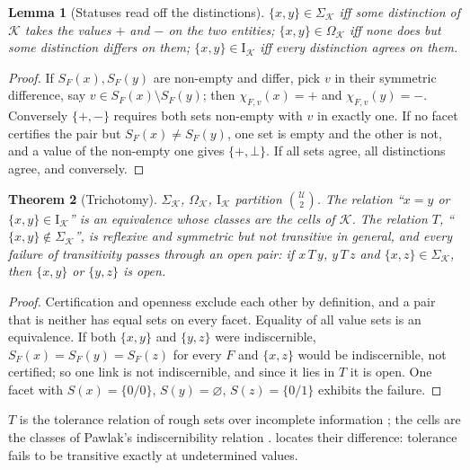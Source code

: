 \documentclass[11pt,twocolumn,a4paper]{article}
\theoremstyle{plain}
\newtheorem{theorem}{Theorem}[section]
\newtheorem{lemma}[theorem]{Lemma}
\theoremstyle{definition}
\theoremstyle{remark}
\newcommand{\U}{\mathcal{U}}
\newcommand{\Kc}{\mathcal{K}}
\newcommand{\Sig}{\Sigma}
\newcommand{\Opn}{\Omega}
\newcommand{\Ind}{\mathrm{I}}
\newcommand{\cp}{\mathord{+}}
\newcommand{\cm}{\mathord{-}}
\newcommand{\cz}{\mathord{\bot}}
\begin{document}
\begin{lemma}[Statuses read off the distinctions]
\label{lem:status}
$\{x,y\}\in\Sig_\Kc$ iff some distinction of $\Kc$ takes the values $\cp$ and
$\cm$ on the two entities; $\{x,y\}\in\Opn_\Kc$ iff none does but some
distinction differs on them; $\{x,y\}\in\Ind_\Kc$ iff every distinction
agrees on them.
\end{lemma}

\begin{proof}
If $S_F(x),S_F(y)$ are non-empty and differ, pick $v$ in their symmetric
difference, say $v\in S_F(x)\setminus S_F(y)$; then $\chi_{F,v}(x)=\cp$ and
$\chi_{F,v}(y)=\cm$. Conversely $\{\cp,\cm\}$ requires both sets non-empty with
$v$ in exactly one. If no facet certifies the pair but $S_F(x)\ne S_F(y)$, one
set is empty and the other is not, and a value of the non-empty one gives
$\{\cp,\cz\}$. If all sets agree, all distinctions agree, and conversely.
\end{proof}

\begin{theorem}[Trichotomy]
\label{thm:trichotomy}
$\Sig_\Kc$, $\Opn_\Kc$, $\Ind_\Kc$ partition $\binom{\U}{2}$. The relation
``$x=y$ or $\{x,y\}\in\Ind_\Kc$'' is an equivalence whose classes are the
\emph{cells} of $\Kc$. The relation $T$, ``$\{x,y\}\notin\Sig_\Kc$'', is
reflexive and symmetric but not transitive in general, and every failure of
transitivity passes through an open pair: if $x\,T\,y$, $y\,T\,z$ and
$\{x,z\}\in\Sig_\Kc$, then $\{x,y\}$ or $\{y,z\}$ is open.
\end{theorem}

\begin{proof}
Certification and openness exclude each other by definition, and a pair that
is neither has equal sets on every facet. Equality of all value sets is an
equivalence. If both $\{x,y\}$ and $\{y,z\}$ were indiscernible,
$S_F(x)=S_F(y)=S_F(z)$ for every $F$ and $\{x,z\}$ would be indiscernible, not
certified; so one link is not indiscernible, and since it lies in $T$ it is
open. One facet with $S(x)=\{0/0\}$, $S(y)=\varnothing$, $S(z)=\{0/1\}$
exhibits the failure.
\end{proof}

$T$ is the tolerance relation of rough sets over incomplete information
\citep{kryszkiewicz1998}; the cells are the classes of Pawlak's
indiscernibility relation \citep{pawlak1982}.  locates their
difference: tolerance fails to be transitive exactly at undetermined values.
\end{document}
